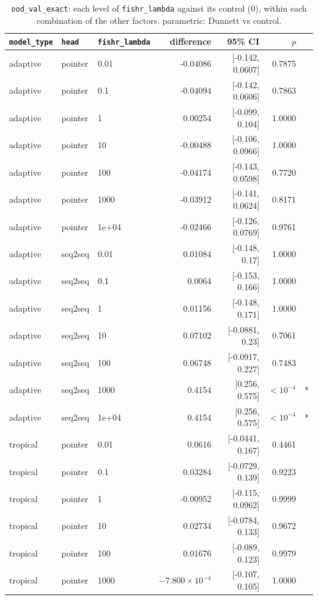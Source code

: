 \documentclass[10pt]{article}
\begin{document}
{\small
\begin{longtable}{lllrrrl}
\caption{\texttt{ood\_val\_exact}: each level of \texttt{fishr\_lambda} against its control (0), within each combination of the other factors. parametric: Dunnett vs control.}\label{tab:control-ood_val_exact}\\
\toprule
\texttt{model\_type} & \texttt{head} & \texttt{fishr\_lambda} & difference & 95\% CI & $p$ & \\
\midrule
\endhead
adaptive & pointer & 0.01 & -0.04086 & [-0.142, 0.0607] & 0.7875 & \\
adaptive & pointer & 0.1 & -0.04094 & [-0.142, 0.0606] & 0.7863 & \\
adaptive & pointer & 1 & 0.00254 & [-0.099, 0.104] & 1.0000 & \\
adaptive & pointer & 10 & -0.00488 & [-0.106, 0.0966] & 1.0000 & \\
adaptive & pointer & 100 & -0.04174 & [-0.143, 0.0598] & 0.7720 & \\
adaptive & pointer & 1000 & -0.03912 & [-0.141, 0.0624] & 0.8171 & \\
adaptive & pointer & 1e+04 & -0.02466 & [-0.126, 0.0769] & 0.9761 & \\
adaptive & seq2seq & 0.01 & 0.01084 & [-0.148, 0.17] & 1.0000 & \\
adaptive & seq2seq & 0.1 & 0.0064 & [-0.153, 0.166] & 1.0000 & \\
adaptive & seq2seq & 1 & 0.01156 & [-0.148, 0.171] & 1.0000 & \\
adaptive & seq2seq & 10 & 0.07102 & [-0.0881, 0.23] & 0.7061 & \\
adaptive & seq2seq & 100 & 0.06748 & [-0.0917, 0.227] & 0.7483 & \\
adaptive & seq2seq & 1000 & 0.4154 & [0.256, 0.575] & $<10^{-4}$ & *\\
adaptive & seq2seq & 1e+04 & 0.4154 & [0.256, 0.575] & $<10^{-4}$ & *\\
tropical & pointer & 0.01 & 0.0616 & [-0.0441, 0.167] & 0.4461 & \\
tropical & pointer & 0.1 & 0.03284 & [-0.0729, 0.139] & 0.9223 & \\
tropical & pointer & 1 & -0.00952 & [-0.115, 0.0962] & 0.9999 & \\
tropical & pointer & 10 & 0.02734 & [-0.0784, 0.133] & 0.9672 & \\
tropical & pointer & 100 & 0.01676 & [-0.089, 0.123] & 0.9979 & \\
tropical & pointer & 1000 & $-7.800\times10^{-4}$ & [-0.107, 0.105] & 1.0000 & \\

\end{longtable}}
\end{document}
